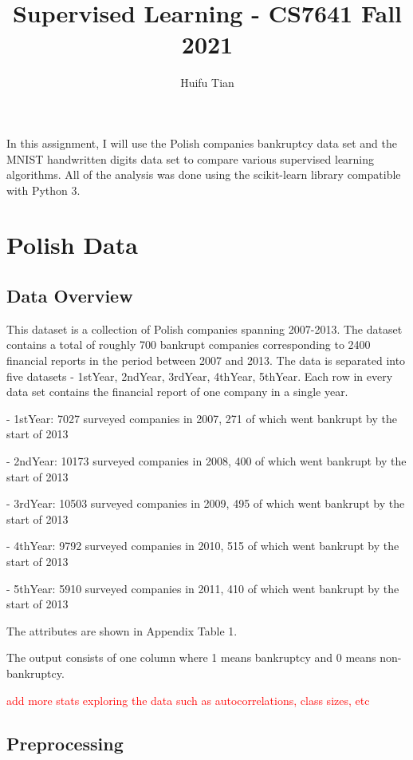 \documentclass{article}
\title{Supervised Learning - CS7641 Fall 2021}
\author{Huifu Tian}
\newcommand\todo[1]{\textcolor{red}{#1}}
\begin{document}
\maketitle


In this assignment, I will use the Polish companies bankruptcy data set and the MNIST handwritten digits data set to compare various supervised learning algorithms. All of the analysis was done using the scikit-learn library compatible with Python 3.



\section{Polish Data}

\subsection{Data Overview}
This dataset is a collection of Polish companies spanning 2007-2013. The dataset contains a total of roughly 700 bankrupt companies corresponding to 2400 financial reports in the period between 2007 and 2013. The data is separated into five datasets - 1stYear, 2ndYear, 3rdYear, 4thYear, 5thYear. Each row in every data set contains the financial report of one company in a single year. \newline

- 1stYear: 7027 surveyed companies in 2007, 271 of which went bankrupt by the start of 2013

- 2ndYear: 10173 surveyed companies in 2008, 400 of which went bankrupt by the start of 2013

- 3rdYear: 10503 surveyed companies in 2009, 495 of which went bankrupt by the start of 2013

- 4thYear: 9792 surveyed companies in 2010, 515 of which went bankrupt by the start of 2013

- 5thYear: 5910 surveyed companies in 2011, 410 of which went bankrupt by the start of 2013\newline


The attributes are shown in Appendix Table 1. \newline

The output consists of one column where 1 means bankruptcy and 0 means non-bankruptcy. \newline

\todo{add more stats exploring the data such as autocorrelations, class sizes, etc}


\subsection{Preprocessing}
\end{document}
